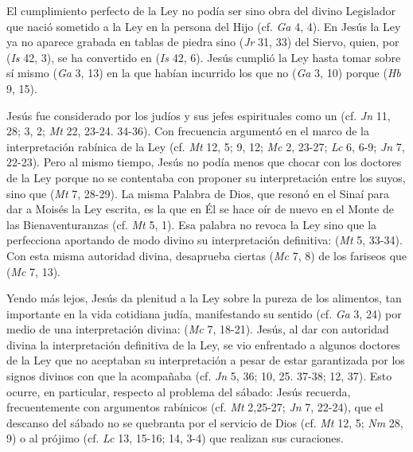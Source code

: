 \begin{ccebody}
 El cumplimiento perfecto de la Ley no podía ser sino obra del divino Legislador que nació sometido a la Ley en la persona del Hijo (cf. \textit{Ga} 4, 4). En Jesús la Ley ya no aparece grabada en tablas de piedra sino  (\textit{Jr} 31, 33) del Siervo, quien, por  (\textit{Is} 42, 3), se ha convertido en  (\textit{Is} 42, 6). Jesús cumplió la Ley hasta tomar sobre sí mismo  (\textit{Ga} 3, 13) en la que habían incurrido los que no  (\textit{Ga} 3, 10) porque  (\textit{Hb} 9, 15).

 Jesús fue considerado por los judíos y sus jefes espirituales como un  (cf. \textit{Jn} 11, 28; 3, 2; \textit{Mt} 22, 23-24. 34-36). Con frecuencia argumentó en el marco de la interpretación rabínica de la Ley (cf. \textit{Mt} 12, 5; 9, 12; \textit{Mc} 2, 23-27; \textit{Lc} 6, 6-9; \textit{Jn} 7, 22-23). Pero al mismo tiempo, Jesús no podía menos que chocar con los doctores de la Ley porque no se contentaba con proponer su interpretación entre los suyos, sino que  (\textit{Mt} 7, 28-29). La misma Palabra de Dios, que resonó en el Sinaí para dar a Moisés la Ley escrita, es la que en Él se hace oír de nuevo en el Monte de las Bienaventuranzas (cf. \textit{Mt} 5, 1). Esa palabra no revoca la Ley sino que la perfecciona aportando de modo divino su interpretación definitiva:  (\textit{Mt} 5, 33-34). Con esta misma autoridad divina, desaprueba ciertas  (\textit{Mc} 7, 8) de los fariseos que  (\textit{Mc} 7, 13).

 Yendo más lejos, Jesús da plenitud a la Ley sobre la pureza de los alimentos, tan importante en la vida cotidiana judía, manifestando su sentido  (cf. \textit{Ga} 3, 24) por medio de una interpretación divina:  (\textit{Mc} 7, 18-21). Jesús, al dar con autoridad divina la interpretación definitiva de la Ley, se vio enfrentado a algunos doctores de la Ley que no aceptaban su interpretación a pesar de estar garantizada por los signos divinos con que la acompañaba (cf. \textit{Jn} 5, 36; 10, 25. 37-38; 12, 37). Esto ocurre, en particular, respecto al problema del sábado: Jesús recuerda, frecuentemente con argumentos rabínicos (cf. \textit{Mt} 2,25-27; \textit{Jn} 7, 22-24), que el descanso del sábado no se quebranta por el servicio de Dios (cf. \textit{Mt} 12, 5; \textit{Nm} 28, 9) o al prójimo (cf. \textit{Lc} 13, 15-16; 14, 3-4) que realizan sus curaciones.
\end{ccebody}

